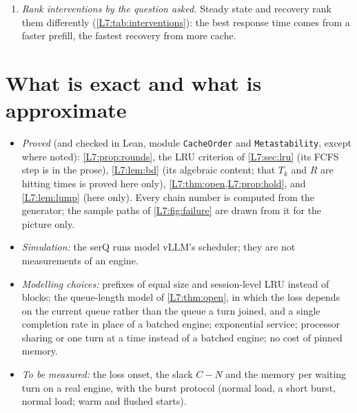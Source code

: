 \begin{enumerate}
{  the next turn served.}
  Queue length alone is exact for steady state and optimistic about recovery by a factor
  of about three (\cref{L7:sec:enough}). A processor-sharing chain cannot be calibrated to
  vLLM's rules; a chain that serves one turn at a time and evicts the next in line fits
  partly and recovers from held-out bursts in \metaPredRecSixty{} and
  \metaPredRecThreeHundred\,s where serQ takes \metaSqRecSixtyB{} and
  \metaSqRecThreeHundredB\,s.
\item \emph{Rank interventions by the question asked.} Steady state and recovery rank
  them differently (\cref{L7:tab:interventions}): the best response time comes from a
  faster prefill, the fastest recovery from more cache.
\end{enumerate}

\section{What is exact and what is approximate}\label{L7:sec:honest}

\begin{itemize}
\item \emph{Proved} (and checked in Lean, module \texttt{CacheOrder} and
  \texttt{Metastability}, except where noted): \cref{L7:prop:rounds}, the LRU criterion of \cref{L7:sec:lru} (its FCFS step is in
  the prose), \cref{L7:lem:bd} (its
  algebraic content; that $T_k$ and $R$ are hitting times is proved here only),
  \cref{L7:thm:open,L7:prop:hold}, and \cref{L7:lem:lump} (here only). Every chain number
  is computed from the generator; the sample paths of \cref{L7:fig:failure} are drawn
  from it for the picture only.
\item \emph{Simulation:} the serQ runs model vLLM's scheduler; they are not measurements
  of an engine.
\item \emph{Modelling choices:} prefixes of equal size and session-level LRU instead of
  blocks; the queue-length model of \cref{L7:thm:open}, in which the loss depends on the
  current queue rather than the queue a turn joined, and a single completion rate in place
  of a batched engine; exponential service; processor
  sharing or one turn at a time instead of a batched engine; no cost of pinned memory.
\item \emph{To be measured:} the loss onset, the slack $C-N$ and the memory per waiting
  turn on a real engine, with the burst protocol (normal load, a short burst, normal load;
  warm and flushed starts).
\end{itemize}

